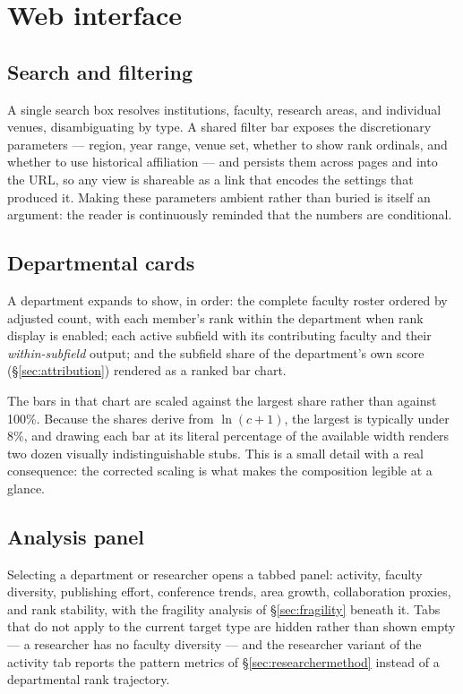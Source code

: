 \documentclass[11pt]{article}
\begin{document}
\section{Web interface}
\label{sec:ui}

\subsection{Search and filtering}

A single search box resolves institutions, faculty, research areas, and
individual venues, disambiguating by type. A shared filter bar exposes the
discretionary parameters --- region, year range, venue set, whether to show
rank ordinals, and whether to use historical affiliation --- and persists them
across pages and into the URL, so any view is shareable as a link that encodes
the settings that produced it. Making these parameters ambient rather than
buried is itself an argument: the reader is continuously reminded that the
numbers are conditional.

\subsection{Departmental cards}

A department expands to show, in order: the complete faculty roster ordered by
adjusted count, with each member's rank within the department when rank display
is enabled; each active subfield with its contributing faculty and their
\emph{within-subfield} output; and the subfield share of the department's own
score (\S\ref{sec:attribution}) rendered as a ranked bar chart.

The bars in that chart are scaled against the largest share rather than against
100\%. Because the shares derive from $\ln(c+1)$, the largest is typically
under 8\%, and drawing each bar at its literal percentage of the available
width renders two dozen visually indistinguishable stubs. This is a small
detail with a real consequence: the corrected scaling is what makes the
composition legible at a glance.

\subsection{Analysis panel}

Selecting a department or researcher opens a tabbed panel: activity,
faculty diversity, publishing effort, conference trends, area growth,
collaboration proxies, and rank stability, with the fragility analysis of
\S\ref{sec:fragility} beneath it. Tabs that do not apply to the current target
type are hidden rather than shown empty --- a researcher has no faculty
diversity --- and the researcher variant of the activity tab reports the
pattern metrics of \S\ref{sec:researchermethod} instead of a departmental rank
trajectory.
\end{document}
